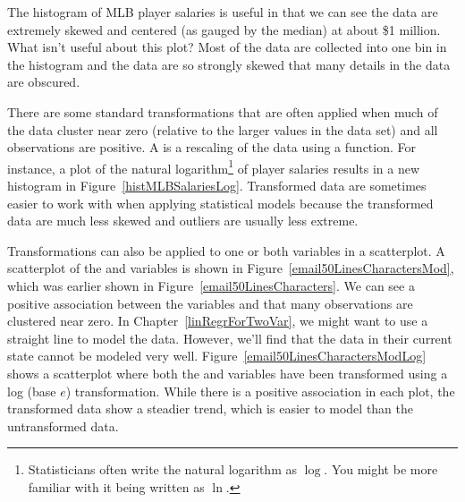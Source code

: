 \begin{example}{The histogram of MLB player salaries is useful in that we can see the data are extremely skewed and centered (as gauged by the median) at about \$1 million. What isn't useful about this plot?}
Most of the data are collected into one bin in the histogram and the data are so strongly skewed that many details in the data are obscured.
\end{example}

There are some standard transformations that are often applied when much of the data cluster near zero (relative to the larger values in the data set) and all observations are positive. A  is a rescaling of the data using a function. For instance, a plot of the natural logarithm\footnote{Statisticians often write the natural logarithm as $\log$. You might be more familiar with it being written as $\ln$.} of player salaries results in a new histogram in Figure~\ref{histMLBSalariesLog}. Transformed data are sometimes easier to work with when applying statistical models because the transformed data are much less skewed and outliers are usually less extreme.

Transformations can also be applied to one or both variables in a scatterplot. A scatterplot of the  and  variables is shown in Figure~\ref{email50LinesCharactersMod}, which was earlier shown in Figure~\ref{email50LinesCharacters}. We can see a positive association between the variables and that many observations are clustered near zero. In Chapter~\ref{linRegrForTwoVar}, we might want to use a straight line to model the data. However, we'll find that the data in their current state cannot be modeled very well. Figure~\ref{email50LinesCharactersModLog} shows a scatterplot where both the  and  variables have been transformed using a log (base $e$) transformation. While there is a positive association in each plot, the transformed data show a steadier trend, which is easier to model than the untransformed data.

